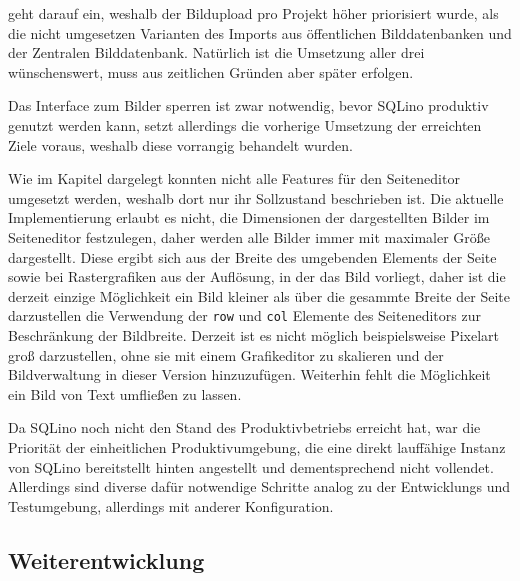 
 geht darauf ein, weshalb der Bildupload pro
Projekt höher priorisiert wurde, als die nicht umgesetzen Varianten des Imports
aus öffentlichen Bilddatenbanken und der Zentralen Bilddatenbank. Natürlich ist
die Umsetzung aller drei wünschenswert, muss aus zeitlichen Gründen aber später
erfolgen.

Das Interface zum Bilder sperren ist zwar notwendig, bevor SQLino produktiv
genutzt werden kann, setzt allerdings die vorherige Umsetzung der erreichten
Ziele voraus, weshalb diese vorrangig behandelt wurden.

Wie im Kapitel  dargelegt konnten nicht alle Features für
den Seiteneditor umgesetzt werden, weshalb dort nur ihr Sollzustand beschrieben
ist. Die aktuelle Implementierung erlaubt es nicht, die Dimensionen der
dargestellten Bilder im Seiteneditor festzulegen, daher werden alle Bilder immer
mit maximaler Größe dargestellt. Diese ergibt sich aus der Breite des umgebenden
Elements der Seite sowie bei Rastergrafiken aus der Auflösung, in der das Bild
vorliegt, daher ist die derzeit einzige Möglichkeit ein Bild kleiner als über
die gesammte Breite der Seite darzustellen die Verwendung der \texttt{row} und
\texttt{col} Elemente des Seiteneditors zur Beschränkung der Bildbreite. Derzeit
ist es nicht möglich beispielsweise Pixelart groß darzustellen, ohne sie mit
einem Grafikeditor zu skalieren und der Bildverwaltung in dieser Version
hinzuzufügen. Weiterhin fehlt die Möglichkeit ein Bild von Text umfließen zu
lassen.

Da SQLino noch nicht den Stand des Produktivbetriebs erreicht hat, war die
Priorität der einheitlichen Produktivumgebung, die eine direkt lauffähige
Instanz von SQLino bereitstellt hinten angestellt und dementsprechend nicht
vollendet. Allerdings sind diverse dafür notwendige Schritte analog zu der
Entwicklungs und Testumgebung, allerdings mit anderer Konfiguration.

\subsection{Weiterentwicklung}




